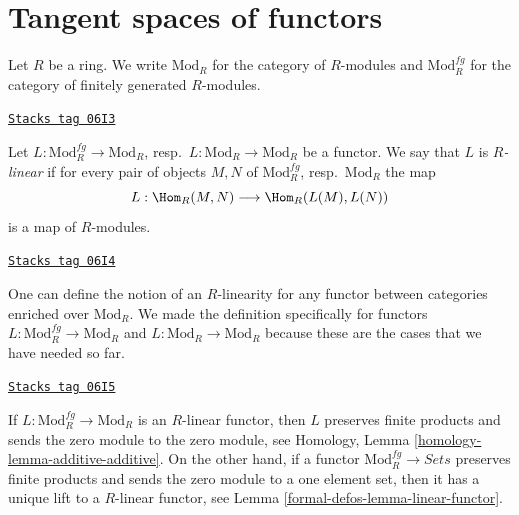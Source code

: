 \section{Tangent spaces of functors}
\label{formal-defos-section-tangent-spaces-functors}
Let $R$ be a ring. We write $\text{Mod}_R$ for the category of
$R$-modules and $\text{Mod}^{fg}_R$ for the category of finitely
generated $R$-modules.

\begin{definition}[Linear]
\label{formal-defos-definition-linear}
\href{https://stacks.math.columbia.edu/tag/06I3}{\texttt{Stacks tag 06I3}}

Let $L: \text{Mod}^{fg}_R \to \text{Mod}_R$,
resp.\ $L: \text{Mod}_R \to \text{Mod}_R$
be a functor.  We say that $L$ is {\it $R$-linear} if for every
pair of objects $M, N$ of $\text{Mod}^{fg}_R$, resp.\ $\text{Mod}_R$
the map
$$
L : \Hom_R(M, N) \longrightarrow \Hom_R(L(M), L(N))
$$
is a map of $R$-modules.
\end{definition}

\begin{remark}
\label{formal-defos-remark-linear-enriched-over-modules}
\href{https://stacks.math.columbia.edu/tag/06I4}{\texttt{Stacks tag 06I4}}

One can define the notion of an $R$-linearity for any functor between
categories enriched over $\text{Mod}_R$. We made the definition
specifically for functors $L: \text{Mod}^{fg}_R \to \text{Mod}_R$ and
$L: \text{Mod}_R \to \text{Mod}_R$
because these are the cases that we have needed so far.
\end{remark}

\begin{remark}
\label{formal-defos-remark-linear-functor}
\href{https://stacks.math.columbia.edu/tag/06I5}{\texttt{Stacks tag 06I5}}

If $L: \text{Mod}^{fg}_R \to \text{Mod}_R$ is an $R$-linear functor,
then $L$ preserves finite products and sends the zero module to the zero
module, see
Homology, Lemma \ref{homology-lemma-additive-additive}.
On the other hand, if a functor $\text{Mod}^{fg}_R \to \textit{Sets}$
preserves finite products and sends the zero module to a one element set,
then it has a unique lift to a $R$-linear functor, see
Lemma \ref{formal-defos-lemma-linear-functor}.
\end{remark}

